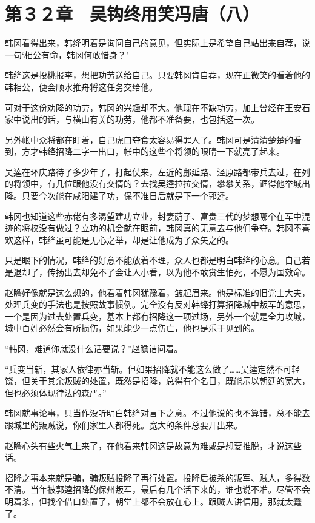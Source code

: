\section{第３２章　吴钩终用笑冯唐（八）}

韩冈看得出来，韩绛明着是询问自己的意见，但实际上是希望自己站出来自荐，说一句‘相公有命，韩冈何敢惜身？’

韩绛这是投桃报李，想把功劳送给自己。只要韩冈肯自荐，现在正微笑的看着他的韩相公，便会顺水推舟将这任务交给他。

可对于这份劝降的功劳，韩冈的兴趣却不大。他现在不缺功劳，加上曾经在王安石家中说出的话，与横山有关的功劳，他都不准备要，也包括这一次。

另外帐中众将都在盯着，自己虎口夺食太容易得罪人了。韩冈可是清清楚楚的看到，方才韩绛招降二字一出口，帐中的这些个将领的眼睛一下就亮了起来。

吴逵在环庆路待了多少年了，打起仗来，左近的鄜延路、泾原路都带兵去过，在列的将领中，有几位跟他没有交情的？去找吴逵拉拉交情，攀攀关系，诓得他举城出降。只要今次能在咸阳建了功，保不准日后就是下一个郭逵。

韩冈也知道这些赤佬有多渴望建功立业，封妻荫子、富贵三代的梦想哪个在军中混迹的将校没有做过？立功的机会就在眼前，韩冈真的无意去与他们争夺。韩冈不喜欢这样，韩绛虽可能是无心之举，却是让他成为了众矢之的。

只是眼下的情况，韩绛的好意不能放着不理，众人也都是明白韩绛的心意。自己若是退却了，传扬出去却免不了会让人小看，以为他不敢贪生怕死，不愿为国效命。

赵瞻好像就是这么想的，他看着韩冈犹豫着，皱起眉来。他是标准的旧党士大夫，处理兵变的手法也是按照故事惯例。完全没有反对韩绛打算招降城中叛军的意思，一个是因为过去处置兵变，基本上都有招降这一项过场，另外一个就是全力攻城，城中百姓必然会有所损伤，如果能少一点伤亡，他也是乐于见到的。

“韩冈，难道你就没什么话要说？”赵瞻诘问着。

“兵变当斩，其家人依律亦当斩。但如果招降就不能这么做了……吴逵定然不可轻饶，但关于其余叛贼的处置，既然是招降，总得有个名目，既能示以朝廷的宽大，但也必须体现律法的森严。”

韩冈就事论事，只当作没听明白韩绛对言下之意。不过他说的也不算错，总不能去跟城里的叛贼说，你们家里人都得死。宽大的条件总要开出来。

赵瞻心头有些火气上来了，在他看来韩冈这是故意为难或是想要推脱，才说这些话。

招降之事本来就是骗，骗叛贼投降了再行处置。投降后被杀的叛军、贼人，多得数不清。当年被郭逵招降的保州叛军，最后有几个活下来的，谁也说不准。尽管不会明着杀，但找个借口处置了，朝堂上都不会放在心上。跟贼人讲信用，那就太蠢了。

